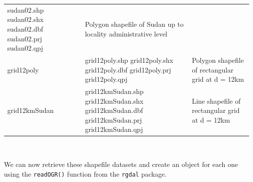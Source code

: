 \documentclass[12pt,a4paper,a4paper]{book}
\theoremstyle{definition}
\theoremstyle{definition}
\theoremstyle{definition}
\theoremstyle{remark}
\begin{document}
\begin{longtable}[]{@{}lll@{}}
\begin{minipage}[t]{0.23\columnwidth}
sudan02.shp sudan02.shx sudan02.dbf sudan02.prj sudan02.qpj\strut
\end{minipage} & \begin{minipage}[t]{0.45\columnwidth}\raggedright
Polygon shapefile of Sudan up to locality administrative level\strut
\end{minipage}\tabularnewline
\begin{minipage}[t]{0.23\columnwidth}\raggedright
grid12poly\strut
\end{minipage} & \begin{minipage}[t]{0.23\columnwidth}\raggedright
grid12poly.shp grid12poly.shx grid12poly.dbf grid12poly.prj
grid12poly.qpj\strut
\end{minipage} & \begin{minipage}[t]{0.45\columnwidth}\raggedright
Polygon shapefile of rectangular grid at d = 12km\strut
\end{minipage}\tabularnewline
\begin{minipage}[t]{0.23\columnwidth}\raggedright
grid12kmSudan\strut
\end{minipage} & \begin{minipage}[t]{0.23\columnwidth}\raggedright
grid12kmSudan.shp grid12kmSudan.shx grid12kmSudan.dbf grid12kmSudan.prj
grid12kmSudan.qpj\strut
\end{minipage} & \begin{minipage}[t]{0.45\columnwidth}\raggedright
Line shapefile of rectangular grid at d = 12km\strut
\end{minipage}\tabularnewline
\bottomrule
\end{longtable}

~

We can now retrieve these shapefile datasets and create an object for
each one using the \texttt{readOGR()} function from the \texttt{rgdal}
package.

~
\end{document}
